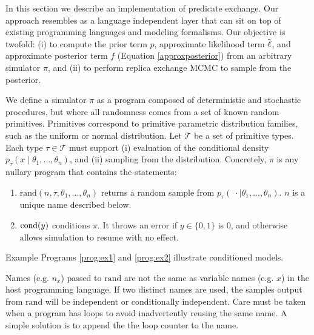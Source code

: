 

In this section we describe an implementation of predicate exchange.
Our approach resembles \citep{wingate2011lightweight, milch20071} as a language independent layer that can sit on top of existing programming languages and modeling formalisms.
Our objective is twofold: (i) to compute the prior term $p$, approximate likelihood term $\tilde{\operatorname{\ell}}$, and approximate posterior term $f$ (Equation \ref{approxposterior}) from an arbitrary simulator $\pi$, and (ii) to perform replica exchange MCMC to sample from the posterior.

We define a simulator $\pi$ as a program composed of deterministic and stochastic procedures, but where all randomness comes from a set of known random primitives.
Primitives correspond to primitive parametric distribution families, such as the uniform or normal distribution.
Let $\mathcal{T}$ be a set of primitive types.
Each type $\tau \in \mathcal{T}$ must support (i) evaluation of the conditional density $p_\tau(x \mid \theta_1, ..., \theta_n)$, and (ii) sampling from the distribution.
Concretely, $\pi$ is any nullary program that contains the statements:

\begin{enumerate}
  \item $\textrm{rand}(n, \tau, \theta_1, ...,\theta_n)$ returns a random sample from $p_\tau(\; \cdot \mid \theta_1, ..., \theta_n)$.  $n$ is a unique name described below.
  \item $\operatorname{cond}(y)$ conditions $\pi$.  It throws an error if $y \in \{0, 1\}$ is 0, and otherwise allows simulation to resume with no effect.
\end{enumerate}

Example Programs \ref{prog:ex1} and \ref{prog:ex2} illustrate conditioned models.

Names (e.g. $n_x$) passed to $\textrm{rand}$ are not the same as variable names (e.g. $x$) in the host programming language.
If two distinct names are used, the samples output from $\textrm{rand}$ will be independent or conditionally independent.
Care must be taken when a program has loops to avoid inadvertently reusing the same name.
A simple solution is to append the the loop counter to the name.



